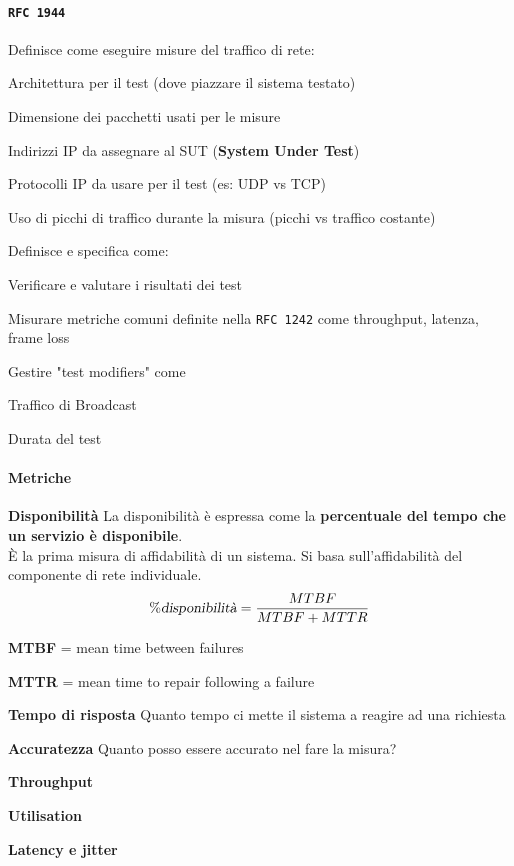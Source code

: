 \documentclass[10pt]{book}
\begin{document}
\paragraph{\texttt{RFC 1944}} Definisce come eseguire misure del traffico di rete:
\begin{list}{-}{}
	\item Architettura per il test (dove piazzare il sistema testato)
	\item Dimensione dei pacchetti usati per le misure
	\item Indirizzi IP da assegnare al SUT (\textbf{System Under Test})
	\item Protocolli IP da usare per il test (es: UDP vs TCP)
	\item Uso di picchi di traffico durante la misura (picchi vs traffico costante)
\end{list}
Definisce e specifica come:
\begin{list}{-}{}
	\item Verificare e valutare i risultati dei test
	\item Misurare metriche comuni definite nella \texttt{RFC 1242} come throughput, latenza, frame loss
	\item Gestire "test modifiers" come
	\begin{list}{-}{}
		\item Traffico di Broadcast
		\item Durata del test
	\end{list}
\end{list}
\paragraph{Metriche}
\begin{list}{}{}
	\item \textbf{Disponibilità} La disponibilità è espressa come la \textbf{percentuale del tempo che un servizio è disponibile}.\\
È la prima misura di affidabilità di un sistema. Si basa sull'affidabilità del componente di rete individuale.
$$ \% \textsl{disponibilità} = \frac{MTBF}{MTBF + MTTR} $$
\begin{list}{}{}
	\item \textbf{MTBF} = mean time between failures
	\item \textbf{MTTR} = mean time to repair following a failure
\end{list}
	\item \textbf{Tempo di risposta} Quanto tempo ci mette il sistema a reagire ad una richiesta
	\item \textbf{Accuratezza} Quanto posso essere accurato nel fare la misura?
	\item \textbf{Throughput}
	\item \textbf{Utilisation}
	\item \textbf{Latency e jitter}
\end{list}
\end{document}
